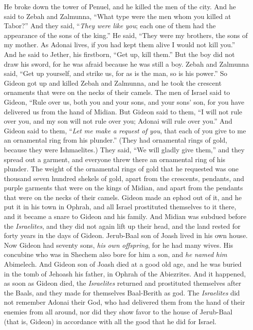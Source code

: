 \begin{biblechapter}
\verse He broke down the tower of Penuel, and he killed the men of the city.
\verse And he said to Zebah and Zalmunna, “What type were the men whom you killed at Tabor?” And they said, “\textit{They were like you}; each one of them had the appearance of the sons of the king.”
\verse He said, “They were my brothers, the sons of my mother. As Adonai lives, if you had kept them alive I would not kill you.”
\verse And he said to Jether, his firstborn, “Get up, kill them.” But the boy did not draw his sword, for he was afraid because he was still a boy.
\verse Zebah and Zalmunna said, “Get up yourself, and strike us, for as is the man, so is his power.” So Gideon got up and killed Zebah and Zalmunna, and he took the crescent ornaments that were on the necks of their camels.
\verse The men of Israel said to Gideon, “Rule over us, both you and your sons, and your sons’ son, for you have delivered us from the hand of Midian.
\verse But Gideon said to them, “I will not rule over you, and my son will not rule over you; Adonai will rule over you.”
\verse And Gideon said to them, “\textit{Let me make a request of you}, that each of you give to me an ornamental ring from his plunder.” (They had ornamental rings of gold, because they were Ishmaelites.)
\verse They said, “We will gladly give them,” and they spread out a garment, and everyone threw there an ornamental ring of his plunder.
\verse The weight of the ornamental rings of gold that he requested was one thousand seven hundred shekels of gold, apart from the crescents, pendants, and purple garments that were on the kings of Midian, and apart from the pendants that were on the necks of their camels.
\verse Gideon made an ephod out of it, and he put it in his town in Ophrah, and all Israel prostituted themselves to it there, and it became a snare to Gideon and his family.
\verse And Midian was subdued before the \textit{Israelites}, and they did not again lift up their head, and the land rested for forty years in the days of Gideon.
 Jerub-Baal son of Joash lived in his own house.
\verse Now Gideon had seventy sons, \textit{his own offspring}, for he had many wives.
\verse His concubine who was in Shechem also bore for him a son, and \textit{he named him} Abimelech.
\verse And Gideon son of Joash died at a good old age, and he was buried in the tomb of Jehoash his father, in Ophrah of the Abiezrites.
\verse And it happened, as soon as Gideon died, the \textit{Israelites} returned and prostituted themselves after the Baals, and they made for themselves Baal-Berith as god.
\verse The \textit{Israelites} did not remember Adonai their God, who had delivered them from the hand of their enemies from all around,
\verse nor did they show favor to the house of Jerub-Baal (that is, Gideon) in accordance with all the good that he did for Israel.
\end{biblechapter}

